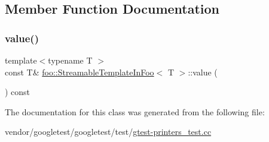 \subsection{Member Function Documentation}
\mbox{\label{classfoo_1_1_streamable_template_in_foo_aa6e29a9a298014ce74c65423b6985023}} 
\subsubsection{\texorpdfstring{value()}{value()}}
{\footnotesize\ttfamily template$<$typename T $>$ \\
const T\& \hyperlink{classfoo_1_1_streamable_template_in_foo}{foo\+::\+Streamable\+Template\+In\+Foo}$<$ T $>$\+::value (\begin{DoxyParamCaption}{ }\end{DoxyParamCaption}) const\hspace{0.3cm}{\ttfamily [inline]}}



The documentation for this class was generated from the following file\+:\begin{DoxyCompactItemize}
\item 
vendor/googletest/googletest/test/\hyperlink{gtest-printers__test_8cc}{gtest-\/printers\+\_\+test.\+cc}\end{DoxyCompactItemize}
